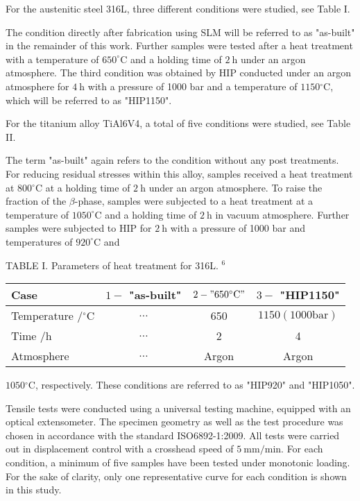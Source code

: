 \documentclass[10pt]{article}
\begin{document}
For the austenitic steel 316L, three different conditions were studied, see Table I.

The condition directly after fabrication using SLM will be referred to as "as-built" in the remainder of this work. Further samples were tested after a heat treatment with a temperature of $650^{\circ} \mathrm{C}$ and a holding time of $2 \mathrm{~h}$ under an argon atmosphere. The third condition was obtained by HIP conducted under an argon atmosphere for $4 \mathrm{~h}$ with a pressure of 1000 bar and a temperature of $1150{ }^{\circ} \mathrm{C}$, which will be referred to as "HIP1150".

For the titanium alloy TiAl6V4, a total of five conditions were studied, see Table II.

The term "as-built" again refers to the condition without any post treatments. For reducing residual stresses within this alloy, samples received a heat treatment at $800{ }^{\circ} \mathrm{C}$ at a holding time of $2 \mathrm{~h}$ under an argon atmosphere. To raise the fraction of the $\beta$-phase, samples were subjected to a heat treatment at a temperature of $1050^{\circ} \mathrm{C}$ and a holding time of $2 \mathrm{~h}$ in vacuum atmosphere. Further samples were subjected to HIP for $2 \mathrm{~h}$ with a pressure of 1000 bar and temperatures of $920^{\circ} \mathrm{C}$ and

TABLE I. Parameters of heat treatment for 316L. ${ }^{6}$

\begin{center}
\begin{tabular}{lccc}
\hline\hline
Case & $1-$ "as-built" & $2-" 650{ }^{\circ} \mathrm{C} "$ & $3-$ "HIP1150" \\
\hline
Temperature $/{ }^{\circ} \mathrm{C}$ & $\ldots$ & 650 & $1150(1000 \mathrm{bar})$ \\
Time $/ \mathrm{h}$ & $\ldots$ & 2 & 4 \\
Atmosphere & $\ldots$ & Argon & Argon \\
\hline\hline
\end{tabular}
\end{center}

$1050{ }^{\circ} \mathrm{C}$, respectively. These conditions are referred to as "HIP920" and "HIP1050".

Tensile tests were conducted using a universal testing machine, equipped with an optical extensometer. The specimen geometry as well as the test procedure was chosen in accordance with the standard ISO6892-1:2009. All tests were carried out in displacement control with a crosshead speed of $5 \mathrm{~mm} / \mathrm{min}$. For each condition, a minimum of five samples have been tested under monotonic loading. For the sake of clarity, only one representative curve for each condition is shown in this study.
\end{document}
